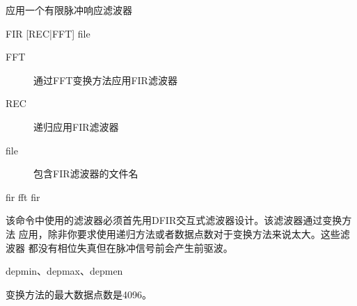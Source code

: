 \label{cmd:fir}

应用一个有限脉冲响应滤波器

\begin{SACSTX}
FIR [REC|FFT] file
\end{SACSTX}

\begin{description}
\item [FFT] 通过FFT变换方法应用FIR滤波器
\item [REC] 递归应用FIR滤波器
\item [file] 包含FIR滤波器的文件名
\end{description}

\begin{SACDFT}
fir fft fir
\end{SACDFT}

该命令中使用的滤波器必须首先用DFIR交互式滤波器设计。该滤波器通过变换方法
应用，除非你要求使用递归方法或者数据点数对于变换方法来说太大。这些滤波器
都没有相位失真但在脉冲信号前会产生前驱波。

depmin、depmax、depmen

变换方法的最大数据点数是4096。
